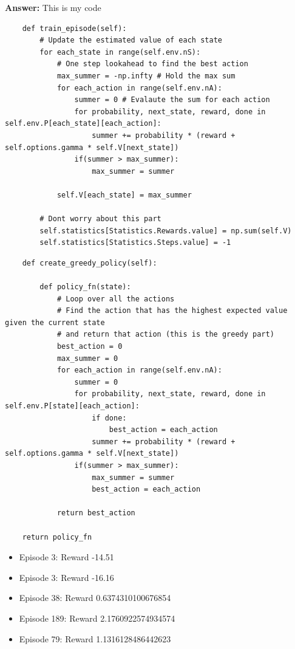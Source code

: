 \documentclass[a4paper]{article}
\theoremstyle{definition}
\begin{document}
\textbf{Answer:}
This is my code
\begin{lstlisting}
    def train_episode(self):
        # Update the estimated value of each state
        for each_state in range(self.env.nS):
            # One step lookahead to find the best action
            max_summer = -np.infty # Hold the max sum
            for each_action in range(self.env.nA):
                summer = 0 # Evalaute the sum for each action
                for probability, next_state, reward, done in self.env.P[each_state][each_action]:
                    summer += probability * (reward + self.options.gamma * self.V[next_state])
                if(summer > max_summer):
                    max_summer = summer
        
            self.V[each_state] = max_summer

        # Dont worry about this part
        self.statistics[Statistics.Rewards.value] = np.sum(self.V)
        self.statistics[Statistics.Steps.value] = -1
\end{lstlisting}
\begin{lstlisting}
    def create_greedy_policy(self):

        def policy_fn(state):
            # Loop over all the actions
            # Find the action that has the highest expected value given the current state
            # and return that action (this is the greedy part)
            best_action = 0
            max_summer = 0
            for each_action in range(self.env.nA):
                summer = 0
                for probability, next_state, reward, done in self.env.P[state][each_action]:
                    if done:
                        best_action = each_action
                    summer += probability * (reward + self.options.gamma * self.V[next_state])
                if(summer > max_summer):
                    max_summer = summer
                    best_action = each_action

            return best_action

    return policy_fn

\end{lstlisting}

\begin{itemize}
    \item Episode 3: Reward -14.51
    \item Episode 3: Reward -16.16
    \item Episode 38: Reward 0.6374310100676854
    \item Episode 189: Reward 2.1760922574934574
    \item Episode 79: Reward 1.1316128486442623
\end{itemize}
\end{document}
